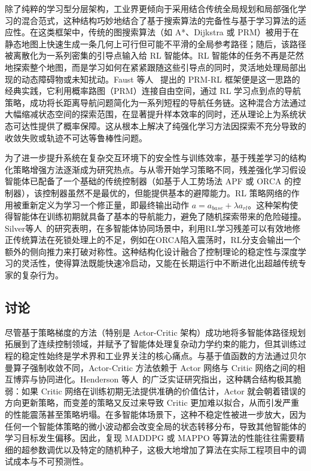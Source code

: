 \documentclass[13.5pt]{extarticle}
\begin{document}
除了纯粹的学习型分层架构，工业界更倾向于采用结合传统全局规划和局部强化学习的混合范式，这种结构巧妙地结合了基于搜索算法的完备性与基于学习算法的适应性。在这类框架中，传统的图搜索算法（如 A*、Dijkstra 或 PRM）被用于在静态地图上快速生成一条几何上可行但可能不平滑的全局参考路径；随后，该路径被离散化为一系列密集的引导点输入给 RL 智能体。RL 智能体的任务不再是茫然地探索整个地图，而是学习如何在紧紧跟随这些引导点的同时，灵活地处理局部出现的动态障碍物或未知扰动。Faust 等人~\cite{faust2018prm} 提出的 PRM-RL 框架便是这一思路的经典实践，它利用概率路图（PRM）连接自由空间，通过 RL 学习点到点的导航策略，成功将长距离导航问题简化为一系列短程的导航任务链。这种混合方法通过大幅缩减状态空间的探索范围，在显著提升样本效率的同时，还从理论上为系统状态可达性提供了概率保障。这从根本上解决了纯强化学习方法因探索不充分导致的收敛失败或轨迹不可达等鲁棒性问题。

为了进一步提升系统在复杂交互环境下的安全性与训练效率，基于残差学习的结构化策略增强方法逐渐成为研究热点。与从零开始学习策略不同，残差强化学习假设智能体已配备了一个基础的传统控制器（如基于人工势场法 APF 或 ORCA 的控制器），该控制器虽然不是最优的，但能提供基本的避障能力。RL 策略网络的作用被重新定义为学习一个修正量，即最终输出动作 $a = a_{base} + \lambda a_{rl}$。这种架构使得智能体在训练初期就具备了基本的导航能力，避免了随机探索带来的危险碰撞。Silver等人~\cite{johannink2019residual}的研究表明，在多智能体协同场景中，利用RL学习残差可以有效地修正传统算法在死锁处理上的不足，例如在ORCA陷入震荡时，RL分支会输出一个额外的侧向推力来打破对称性。这种结构化设计融合了控制理论的稳定性与深度学习的灵活性，使得算法既能快速冷启动，又能在长期运行中不断进化出超越传统专家的复杂行为。

\subsection{讨论}

尽管基于策略梯度的方法（特别是 Actor-Critic 架构）成功地将多智能体路径规划拓展到了连续控制领域，并赋予了智能体处理复杂动力学约束的能力，但其训练过程的稳定性始终是学术界和工业界关注的核心痛点。与基于值函数的方法通过贝尔曼算子强制收敛不同，Actor-Critic 方法依赖于 Actor 网络与 Critic 网络之间的相互博弈与协同进化。Henderson 等人~\cite{henderson2018deep}的广泛实证研究指出，这种耦合结构极其脆弱：如果 Critic 网络在训练初期无法提供准确的价值估计，Actor 就会朝着错误的方向更新策略，而变差的策略又反过来导致 Critic 更加难以拟合，从而引发严重的性能震荡甚至策略坍塌。在多智能体场景下，这种不稳定性被进一步放大，因为任何一个智能体策略的微小波动都会改变全局的状态转移分布，导致其他智能体的学习目标发生偏移。因此，复现 MADDPG 或 MAPPO 等算法的性能往往需要精细的超参数调优以及特定的随机种子，这极大地增加了算法在实际工程项目中的调试成本与不可预测性。
\end{document}
